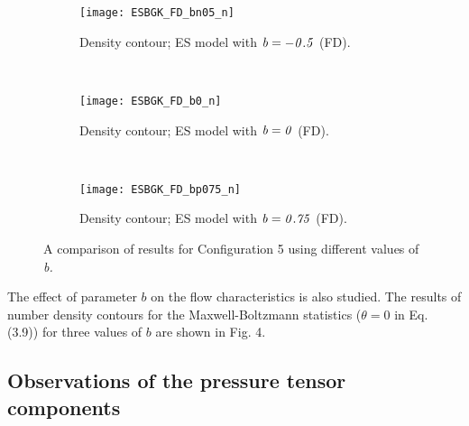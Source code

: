 \documentclass{rsproca}%
\begin{document}
\begin{figure}
				\begin{subfigure}[b]{0.32\textwidth}
                \centering
                \texttt{[image: ESBGK\_FD\_bn05\_n]}
                \caption{Density contour; ES model with $\it{b=-0.5}$ (FD).}
                \label{fig:ESBGK_FD_bn05_n}
        \end{subfigure}%
        ~ %
        \begin{subfigure}[b]{0.32\textwidth}
                \centering
                \texttt{[image: ESBGK\_FD\_b0\_n]}
                \caption{Density contour; ES model with $\it{b=0}$ (FD).}
                \label{fig:ESBGK_FD_b0_n}
        \end{subfigure}
        ~ %
        \begin{subfigure}[b]{0.32\textwidth}
                \centering
                \texttt{[image: ESBGK\_FD\_bp075\_n]}
                \caption{Density contour; ES model with $\it{b=0.75}$ (FD).}
                \label{fig:ESBGK_FD_bp075_n}
        \end{subfigure}	
        \caption{A comparison of results for Configuration 5 using different values of \it{b}.}\label{fig:test_b_parameter}
\end{figure}
The effect of parameter $b$ on the flow characteristics is also studied.  The results of number density contours for the Maxwell-Boltzmann statistics ($\theta=0$ in Eq. (3.9)) for three values of $b$ are shown in Fig. 4.

\subsection{Observations of the pressure tensor components}
\end{document}
